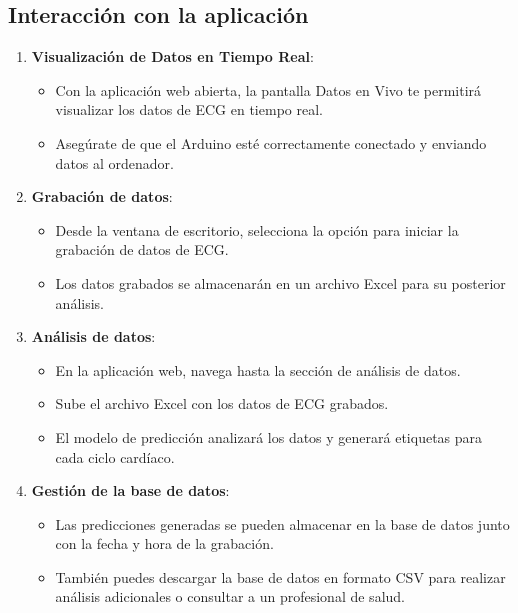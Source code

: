 \subsection{Interacción con la aplicación}
\begin{enumerate}
    \item \textbf{Visualización de Datos en Tiempo Real}:
    \begin{itemize}
        \item Con la aplicación web abierta, la pantalla Datos en Vivo te permitirá visualizar los datos de ECG en tiempo real.
        \item Asegúrate de que el Arduino esté correctamente conectado y enviando datos al ordenador.
    \end{itemize}

    \item \textbf{Grabación de datos}:
    \begin{itemize}
        \item Desde la ventana de escritorio, selecciona la opción para iniciar la grabación de datos de ECG.
        \item Los datos grabados se almacenarán en un archivo Excel para su posterior análisis.
    \end{itemize}

    \item \textbf{Análisis de datos}:
    \begin{itemize}
        \item En la aplicación web, navega hasta la sección de análisis de datos.
        \item Sube el archivo Excel con los datos de ECG grabados.
        \item El modelo de predicción analizará los datos y generará etiquetas para cada ciclo cardíaco.
    \end{itemize}

    \item \textbf{Gestión de la base de datos}:
    \begin{itemize}
        \item Las predicciones generadas se pueden almacenar en la base de datos junto con la fecha y hora de la grabación.
        \item También puedes descargar la base de datos en formato CSV para realizar análisis adicionales o consultar a un profesional de salud.
    \end{itemize}
\end{enumerate}



